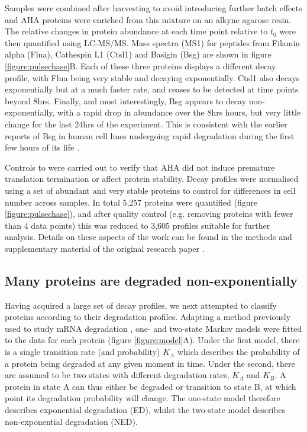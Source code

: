 \documentclass[a4paper,11pt,twoside,openright]{scrbook}
\begin{document}
Samples were combined after harvesting to avoid introducing further batch effects and AHA proteins were enriched from this mixture on an alkyne agarose resin. The relative changes in protein abundance at each time point relative to $t_{0}$ were then quantified using LC-MS/MS. Mass spectra (MS1) for peptides from Filamin  alpha (Flna), Cathespin L1 (Ctsl1) and Basigin (Bsg) are shown in figure \ref{figure:pulsechase}B. Each of these three proteins displays a different decay profile, with Flna being very stable and decaying exponentially. Ctsl1 also decays exponentially but at a much faster rate, and ceases to be detected at time points beyond 8hrs. Finally, and most interestingly, Bsg appears to decay non-exponentially, with a rapid drop in abundance over the 8hrs hours, but very little change for the last 24hrs of the experiment. This is consistent with the earlier reports of Bsg in human cell lines undergoing rapid degradation during the first few hours of its life \cite{Tyler2012}.

Controls to were carried out to verify that AHA did not induce premature translation termination or affect protein stability. Decay profiles were normalised using a set of abundant and very stable proteins to control for differences in cell number across samples. In total 5,257 proteins were quantified (figure \ref{figure:pulsechase}), and after quality control (e.g. removing proteins with fewer than 4 data points) this was reduced to 3,605 profiles suitable for further analysis. Details on these aspects of the work can be found in the methods and supplementary material of the original research paper \cite{McShane2016}.

\subsection{Many proteins are degraded non-exponentially}
Having acquired a large set of decay profiles, we next attempted to classify proteins according to their degradation profiles. Adapting a method previously used to study mRNA degradation \cite{Deneke2013}, one- and two-state Markov models were fitted to the data for each protein (figure \ref{figure:model}A). Under the first model, there is a single transition rate (and probability) $K_{A}$ which describes the probability of a protein being degraded at any given moment in time. Under the second, there are assumed to be two states with different degradation rates, $K_{A}$ and $K_{B}$. A protein in state A can thus either be degraded or transition to state B, at which point its degradation probability will change. The one-state model therefore describes exponential degradation (ED), whilst the two-state model describes non-exponential degradation (NED).
\end{document}
